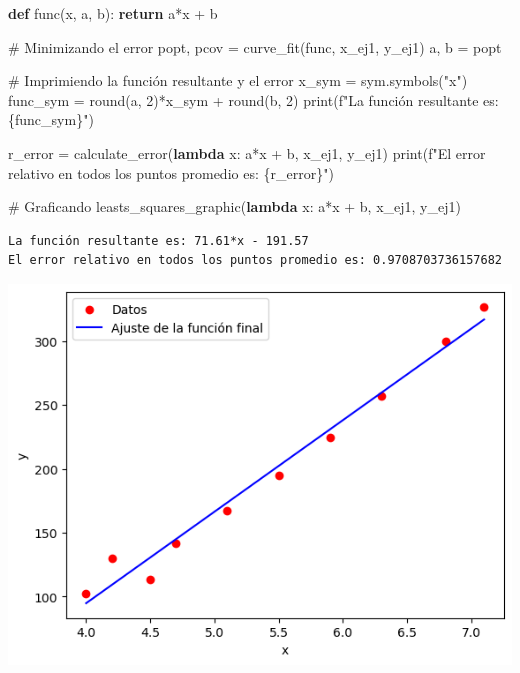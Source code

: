 \documentclass[
  letterpaper,
  DIV=11,
  numbers=noendperiod]{scrartcl}
\newenvironment{Shaded}{\begin{snugshade}}{\end{snugshade}}
\newcommand{\BuiltInTok}[1]{\textcolor[rgb]{0.00,0.23,0.31}{#1}}
\newcommand{\CommentTok}[1]{\textcolor[rgb]{0.37,0.37,0.37}{#1}}
\newcommand{\ControlFlowTok}[1]{\textcolor[rgb]{0.00,0.23,0.31}{\textbf{#1}}}
\newcommand{\DecValTok}[1]{\textcolor[rgb]{0.68,0.00,0.00}{#1}}
\newcommand{\KeywordTok}[1]{\textcolor[rgb]{0.00,0.23,0.31}{\textbf{#1}}}
\newcommand{\NormalTok}[1]{\textcolor[rgb]{0.00,0.23,0.31}{#1}}
\newcommand{\OperatorTok}[1]{\textcolor[rgb]{0.37,0.37,0.37}{#1}}
\newcommand{\SpecialCharTok}[1]{\textcolor[rgb]{0.37,0.37,0.37}{#1}}
\newcommand{\SpecialStringTok}[1]{\textcolor[rgb]{0.13,0.47,0.30}{#1}}
\newcommand{\StringTok}[1]{\textcolor[rgb]{0.13,0.47,0.30}{#1}}
\begin{document}
\begin{Shaded}
\begin{Highlighting}[]

\KeywordTok{def}\NormalTok{ func(x, a, b):}
    \ControlFlowTok{return}\NormalTok{ a}\OperatorTok{*}\NormalTok{x }\OperatorTok{+}\NormalTok{ b}

\CommentTok{\# Minimizando el error}
\NormalTok{popt, pcov }\OperatorTok{=}\NormalTok{ curve\_fit(func, x\_ej1, y\_ej1)}
\NormalTok{a, b }\OperatorTok{=}\NormalTok{ popt}

\CommentTok{\# Imprimiendo la función resultante y el error}
\NormalTok{x\_sym }\OperatorTok{=}\NormalTok{ sym.symbols(}\StringTok{"x"}\NormalTok{)}
\NormalTok{func\_sym }\OperatorTok{=} \BuiltInTok{round}\NormalTok{(a, }\DecValTok{2}\NormalTok{)}\OperatorTok{*}\NormalTok{x\_sym }\OperatorTok{+} \BuiltInTok{round}\NormalTok{(b, }\DecValTok{2}\NormalTok{)}
\BuiltInTok{print}\NormalTok{(}\SpecialStringTok{f"La función resultante es: }\SpecialCharTok{\{}\NormalTok{func\_sym}\SpecialCharTok{\}}\SpecialStringTok{"}\NormalTok{)}

\NormalTok{r\_error }\OperatorTok{=}\NormalTok{ calculate\_error(}\KeywordTok{lambda}\NormalTok{ x: a}\OperatorTok{*}\NormalTok{x }\OperatorTok{+}\NormalTok{ b, x\_ej1, y\_ej1)}
\BuiltInTok{print}\NormalTok{(}\SpecialStringTok{f"El error relativo en todos los puntos promedio es: }\SpecialCharTok{\{}\NormalTok{r\_error}\SpecialCharTok{\}}\SpecialStringTok{"}\NormalTok{)}

\CommentTok{\# Graficando}
\NormalTok{leasts\_squares\_graphic(}\KeywordTok{lambda}\NormalTok{ x: a}\OperatorTok{*}\NormalTok{x }\OperatorTok{+}\NormalTok{ b, x\_ej1, y\_ej1)}
\end{Highlighting}
\end{Shaded}

\begin{verbatim}
La función resultante es: 71.61*x - 191.57
El error relativo en todos los puntos promedio es: 0.9708703736157682
\end{verbatim}

\includegraphics{Tarea8_MN_files/figure-pdf/cell-4-output-2.png}
\end{document}
